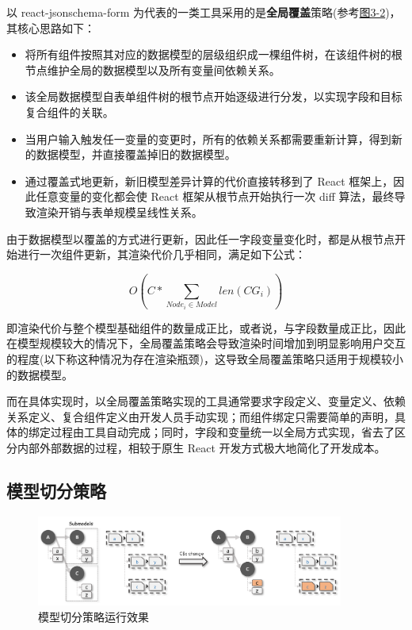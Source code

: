 \documentclass[winfonts,master,twoside]{njuthesis}
\begin{document}
以 react-jsonschema-form 为代表的一类工具采用的是\textbf{全局覆盖}策略(参考\hyperref[global-cover]{图3-2})，其核心思路如下：

\begin{itemize}
    \item 将所有组件按照其对应的数据模型的层级组织成一棵组件树，在该组件树的根节点维护全局的数据模型以及所有变量间依赖关系。
    \item 该全局数据模型自表单组件树的根节点开始逐级进行分发，以实现字段和目标复合组件的关联。
    \item 当用户输入触发任一变量的变更时，所有的依赖关系都需要重新计算，得到新的数据模型，并直接覆盖掉旧的数据模型。
    \item 通过覆盖式地更新，新旧模型差异计算的代价直接转移到了 React 框架上，因此任意变量的变化都会使 React 框架从根节点开始执行一次 diff 算法，最终导致渲染开销与表单规模呈线性关系。
\end{itemize}

由于数据模型以覆盖的方式进行更新，因此任一字段变量变化时，都是从根节点开始进行一次组件更新，其渲染代价几乎相同，满足如下公式：

\begin{equation}
O(C*\sum_{Node_i\in Model}len(CG_i))
\end{equation}

即渲染代价与整个模型基础组件的数量成正比，或者说，与字段数量成正比，因此在模型规模较大的情况下，全局覆盖策略会导致渲染时间增加到明显影响用户交互的程度(以下称这种情况为存在渲染瓶颈)，这导致全局覆盖策略只适用于规模较小的数据模型。

而在具体实现时，以全局覆盖策略实现的工具通常要求字段定义、变量定义、依赖关系定义、复合组件定义由开发人员手动实现；而组件绑定只需要简单的声明，具体的绑定过程由工具自动完成；同时，字段和变量统一以全局方式实现，省去了区分内部外部数据的过程，相较于原生 React 开发方式极大地简化了开发成本。

\subsection{模型切分策略}

\begin{figure}[h]
    \centering
    \includegraphics[width=0.9\textwidth]{figure/chapter-2/model-split.png}
    \caption{模型切分策略运行效果}
    \label{model-split}
\end{figure}
\end{document}
